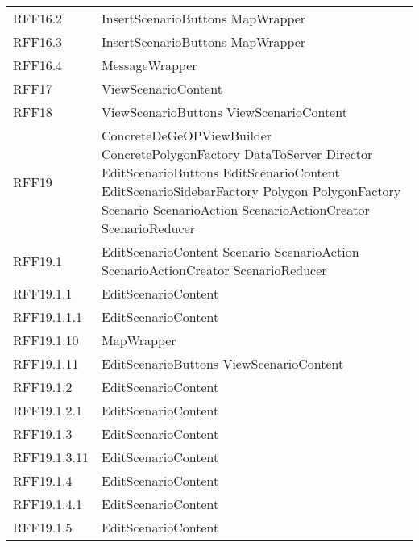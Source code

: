 \begin{longtable}{p{2.5cm}!{\VRule[1pt]}p{5cm}}
		RFF16.2 & InsertScenarioButtons \newline MapWrapper\\
		RFF16.3 & InsertScenarioButtons \newline MapWrapper\\
		RFF16.4 & MessageWrapper\\
		RFF17 & ViewScenarioContent\\
		RFF18 & ViewScenarioButtons \newline ViewScenarioContent\\
		RFF19 & ConcreteDeGeOPViewBuilder \newline ConcretePolygonFactory \newline DataToServer \newline Director \newline EditScenarioButtons \newline EditScenarioContent \newline EditScenarioSidebarFactory \newline Polygon \newline PolygonFactory \newline Scenario \newline ScenarioAction \newline ScenarioActionCreator \newline ScenarioReducer\\
		RFF19.1 & EditScenarioContent \newline Scenario \newline ScenarioAction \newline ScenarioActionCreator \newline ScenarioReducer\\
		RFF19.1.1 & EditScenarioContent\\
		RFF19.1.1.1 & EditScenarioContent\\
		RFF19.1.10 & MapWrapper\\
		RFF19.1.11 & EditScenarioButtons \newline ViewScenarioContent\\
		RFF19.1.2 & EditScenarioContent\\
		RFF19.1.2.1 & EditScenarioContent\\
		RFF19.1.3 & EditScenarioContent\\
		RFF19.1.3.11 & EditScenarioContent\\
		RFF19.1.4 & EditScenarioContent\\
		RFF19.1.4.1 & EditScenarioContent\\
		RFF19.1.5 & EditScenarioContent\\

\end{longtable}
